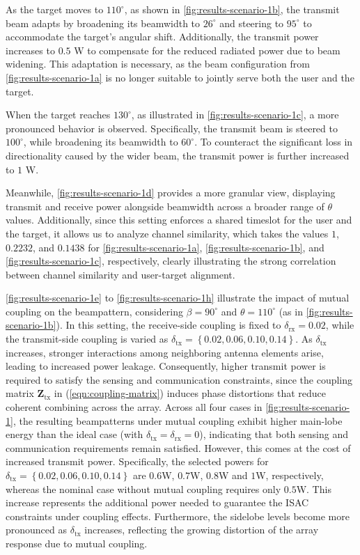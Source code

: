 \documentclass[10pt,journal,compsoc]{IEEEtran}
\theoremstyle{myremark}
\theoremstyle{myexample}
\begin{document}
As the target moves to $ 110^\circ $, as shown in \cref{fig:results-scenario-1b}, the transmit beam adapts by broadening its beamwidth to $ 26^\circ $ and steering to $ 95^\circ $ to accommodate the target's angular shift. Additionally, the transmit power increases to $ 0.5 $ W to compensate for the reduced radiated power due to beam widening. This adaptation is necessary, as the beam configuration from \cref{fig:results-scenario-1a} is no longer suitable to jointly serve both the user and the target.


When the target reaches $ 130^\circ $, as illustrated in \cref{fig:results-scenario-1c}, a more pronounced behavior is observed. Specifically, the transmit beam is steered to $ 100^\circ $, while broadening its beamwidth to $ 60^\circ $. To counteract the significant loss in directionality caused by the wider beam, the transmit power is further increased to $ 1 $ W.


Meanwhile, \cref{fig:results-scenario-1d} provides a more granular view, displaying transmit and receive power alongside beamwidth across a broader range of $ \theta $ values. Additionally, since this setting enforces a shared timeslot for the user and the target, it allows us to analyze channel similarity, which takes the values $1$, $0.2232$, and $0.1438$ for \cref{fig:results-scenario-1a}, \cref{fig:results-scenario-1b}, and \cref{fig:results-scenario-1c}, respectively, clearly illustrating the strong correlation between channel similarity and user-target alignment.



\cref{fig:results-scenario-1e} to \cref{fig:results-scenario-1h} illustrate the impact of mutual coupling on the beampattern, considering $ \beta = 90^\circ $ and $ \theta = 110^\circ $ (as in \cref{fig:results-scenario-1b}). In this setting, the receive-side coupling is fixed to $ \delta_\mathrm{rx} = 0.02 $, while the transmit-side coupling is varied as $ \delta_\mathrm{tx} = \left\lbrace 0.02, 0.06, 0.10, 0.14  \right\rbrace $. As $ \delta_\mathrm{tx} $ increases, stronger interactions among neighboring antenna elements arise, leading to increased power leakage. Consequently, higher transmit power is required to satisfy the sensing and communication constraints, since the coupling matrix $ \mathbf{Z}_\mathrm{tx} $ in (\ref{eqn:coupling-matrix}) induces phase distortions that reduce coherent combining across the array. Across all four cases in \cref{fig:results-scenario-1}, the resulting beampatterns under mutual coupling exhibit higher main-lobe energy than the ideal case (with $ \delta_\mathrm{tx} = \delta_\mathrm{rx} = 0 $), indicating that both sensing and communication requirements remain satisfied. However, this comes at the cost of increased transmit power. Specifically, the selected powers for $ \delta_\mathrm{tx} = \left\lbrace 0.02, 0.06, 0.10, 0.14  \right\rbrace $ are $0.6$W, $0.7$W, $0.8$W and $1$W, respectively, whereas the nominal case without mutual coupling requires only $0.5$W. This increase represents the additional power needed to guarantee the ISAC constraints under coupling effects. Furthermore, the sidelobe levels become more pronounced as $ \delta_\mathrm{tx} $ increases, reflecting the growing distortion of the array response due to mutual coupling.
\end{document}
